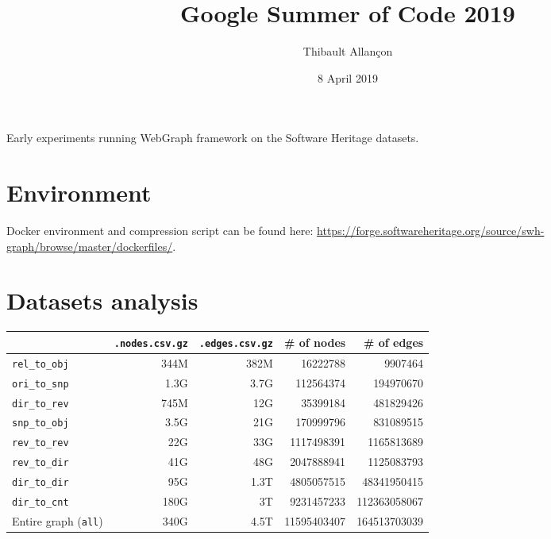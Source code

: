 \documentclass[11pt,a4paper]{article}
\title{Google Summer of Code 2019}
\author{Thibault Allançon}
\date{8 April 2019}
\begin{document}
\maketitle

Early experiments running WebGraph framework on the Software Heritage datasets.

\section{Environment}

Docker environment and compression script can be found here:
\url{https://forge.softwareheritage.org/source/swh-graph/browse/master/dockerfiles/}.

\section{Datasets analysis}

\begin{center}
    \begin{tabular}{@{} l *4r @{}}
        \toprule
        \multicolumn{1}{c}{} &
            \textbf{\texttt{.nodes.csv.gz}} &
            \textbf{\texttt{.edges.csv.gz}} &
            \textbf{\# of nodes} & \textbf{\# of edges} \\
        \midrule
        \texttt{rel\_to\_obj}
            & 344M & 382M & \num{16222788} & \num{9907464} \\
        \texttt{ori\_to\_snp}
            & 1.3G & 3.7G & \num{112564374} & \num{194970670} \\
        \texttt{dir\_to\_rev}
            & 745M & 12G & \num{35399184} & \num{481829426} \\
        \texttt{snp\_to\_obj}
            & 3.5G & 21G & \num{170999796} & \num{831089515} \\
        \texttt{rev\_to\_rev}
            & 22G & 33G & \num{1117498391} & \num{1165813689} \\
        \texttt{rev\_to\_dir}
            & 41G & 48G & \num{2047888941} & \num{1125083793} \\
        \texttt{dir\_to\_dir}
            & 95G & 1.3T & \num{4805057515} & \num{48341950415} \\
        \texttt{dir\_to\_cnt}
            & 180G & 3T & \num{9231457233} & \num{112363058067} \\
        \midrule
        Entire graph (\texttt{all})
            & 340G & 4.5T & \num{11595403407} & \num{164513703039} \\
        \bottomrule
    \end{tabular}
\end{center}
\end{document}
